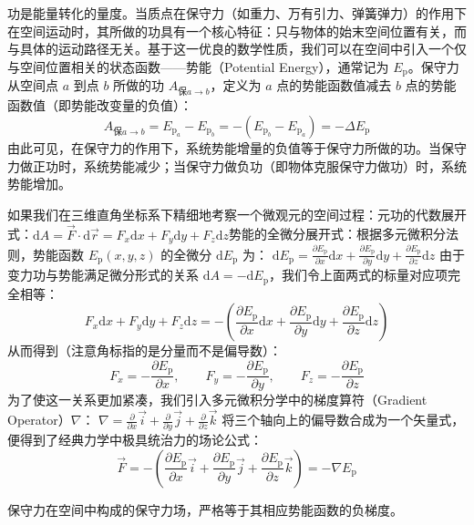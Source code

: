 \begin{definition}[势能]
功是能量转化的量度。当质点在保守力（如重力、万有引力、弹簧弹力）的作用下在空间运动时，其所做的功具有一个核心特征：只与物体的始末空间位置有关，而与具体的运动路径无关。基于这一优良的数学性质，我们可以在空间中引入一个仅与空间位置相关的状态函数——势能（Potential Energy），通常记为 $E_{\text{p}}$。保守力从空间点 $a$ 到点 $b$ 所做的功 $A_{\text{保}a \to b}$，定义为 $a$ 点的势能函数值减去 $b$ 点的势能函数值（即势能改变量的负值）：$$A_{\text{保}a \to b} = E_{\text{p}_a} - E_{\text{p}_b} = -\left(E_{\text{p}_b} - E_{\text{p}_a}\right) = -\Delta E_{\text{p}}$$由此可见，在保守力的作用下，系统势能增量的负值等于保守力所做的功。当保守力做正功时，系统势能减少；当保守力做负功（即物体克服保守力做功）时，系统势能增加。
\end{definition}
如果我们在三维直角坐标系下精细地考察一个微观元的空间过程：元功的代数展开式：$\mathrm{d}A = \vec{F} \cdot \mathrm{d}\vec{r} = F_x\mathrm{d}x + F_y\mathrm{d}y + F_z\mathrm{d}z$势能的全微分展开式：根据多元微积分法则，势能函数 $E_{\text{p}}(x, y, z)$ 的全微分 $\mathrm{d}E_{\text{p}}$ 为：
 \(\mathrm{d}E_{\text{p}} = \frac{\partial E_{\text{p}}}{\partial x}\mathrm{d}x + \frac{\partial E_{\text{p}}}{\partial y}\mathrm{d}y + \frac{\partial E_{\text{p}}}{\partial z}\mathrm{d}z\) 
由于变力功与势能满足微分形式的关系 $\mathrm{d}A = -\mathrm{d}E_{\text{p}}$，我们令上面两式的标量对应项完全相等：
$$F_x\mathrm{d}x + F_y\mathrm{d}y + F_z\mathrm{d}z = -\left( \frac{\partial E_{\text{p}}}{\partial x}\mathrm{d}x + \frac{\partial E_{\text{p}}}{\partial y}\mathrm{d}y + \frac{\partial E_{\text{p}}}{\partial z}\mathrm{d}z \right)$$
从而得到（注意角标指的是分量而不是偏导数）：
$$F_x = -\frac{\partial E_{\text{p}}}{\partial x}, \qquad F_y = -\frac{\partial E_{\text{p}}}{\partial y}, \qquad F_z = -\frac{\partial E_{\text{p}}}{\partial z}$$
为了使这一关系更加紧凑，我们引入多元微积分学中的梯度算符（Gradient Operator）$\nabla$：
 \(\nabla = \frac{\partial}{\partial x}\vec{i} + \frac{\partial}{\partial y}\vec{j} + \frac{\partial}{\partial z}\vec{k}\) 
将三个轴向上的偏导数合成为一个矢量式，便得到了经典力学中极具统治力的场论公式：
$$\vec{F} = -\left( \frac{\partial E_{\text{p}}}{\partial x}\vec{i} + \frac{\partial E_{\text{p}}}{\partial y}\vec{j} + \frac{\partial E_{\text{p}}}{\partial z}\vec{k} \right) = -\nabla E_{\text{p}}$$

\begin{theorem}
保守力在空间中构成的保守力场，严格等于其相应势能函数的负梯度。
\end{theorem}

